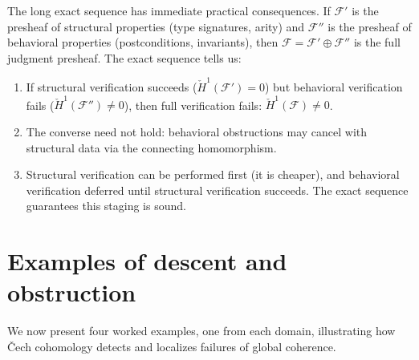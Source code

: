 \begin{remark}
\label{rem:les-operational}
The long exact sequence has immediate practical consequences.  If
$\mathcal{F}'$ is the presheaf of structural properties (type
signatures, arity) and $\mathcal{F}''$ is the presheaf of behavioral
properties (postconditions, invariants), then $\mathcal{F} = \mathcal{F}'
\oplus \mathcal{F}''$ is the full judgment presheaf.  The exact
sequence tells us:

\begin{enumerate}[nosep]
\item If structural verification succeeds ($\check{H}^1(\mathcal{F}') = 0$)
  but behavioral verification fails ($\check{H}^1(\mathcal{F}'') \neq 0$),
  then full verification fails:
  $\check{H}^1(\mathcal{F}) \neq 0$.

\item The converse need not hold: behavioral obstructions may cancel
  with structural data via the connecting homomorphism.

\item Structural verification can be performed first (it is cheaper),
  and behavioral verification deferred until structural verification
  succeeds.  The exact sequence guarantees this staging is sound.
\end{enumerate}
\end{remark}



\section{Examples of descent and obstruction}
\label{sec:cech:examples}

We now present four worked examples, one from each domain, illustrating
how \v{C}ech cohomology detects and localizes failures of global
coherence.

